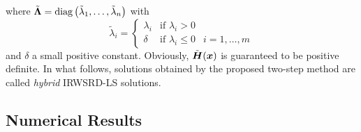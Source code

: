 where $\tilde{\mbox{\boldmath{$\Lambda$}}}=\mbox{diag}\left(\tilde{\lambda}_1,\ldots,\tilde{\lambda}_n\right)$ with
\begin{equation}
\nonumber
\tilde{\lambda}_i=\left\{\begin{array} {lll}
    \lambda_i & \mbox{if } \lambda_i>0 & \\
    \delta &  \mbox{if } \lambda_i\leq0 & i=1,\ldots,m \end{array} \right.
\end{equation}
and $\delta$ a small positive constant. Obviously, $\tilde{\mbox{\boldmath$H$}}(\mbox{\boldmath$x$})$ is guaranteed to be positive definite. In what follows, solutions obtained by the proposed two-step method are called \textit{hybrid} IRWSRD-LS solutions.

\subsection{Numerical Results}

